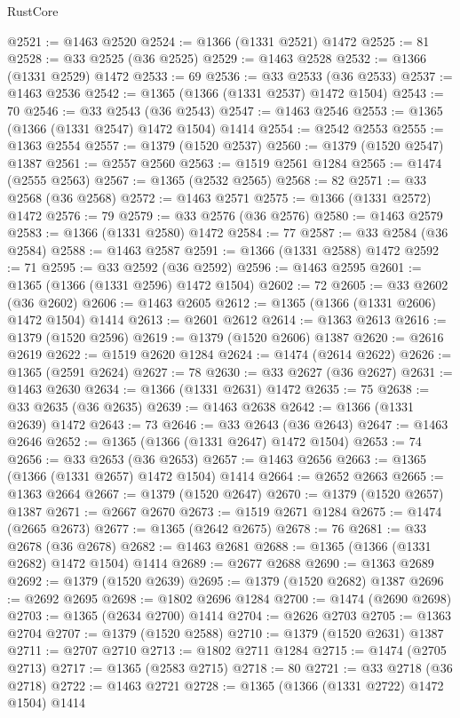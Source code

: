 \begin{lexlean}{RustCore}
\begin{coremodule}
@2521 := @1463 @2520
@2524 := @1366 (@1331 @2521) @1472
@2525 := 81
@2528 := @33 @2525 (@36 @2525)
@2529 := @1463 @2528
@2532 := @1366 (@1331 @2529) @1472
@2533 := 69
@2536 := @33 @2533 (@36 @2533)
@2537 := @1463 @2536
@2542 := @1365 (@1366 (@1331 @2537) @1472 @1504)
@2543 := 70
@2546 := @33 @2543 (@36 @2543)
@2547 := @1463 @2546
@2553 := @1365 (@1366 (@1331 @2547) @1472 @1504) @1414
@2554 := @2542 @2553
@2555 := @1363 @2554
@2557 := @1379 (@1520 @2537)
@2560 := @1379 (@1520 @2547) @1387
@2561 := @2557 @2560
@2563 := @1519 @2561 @1284
@2565 := @1474 (@2555 @2563)
@2567 := @1365 (@2532 @2565)
@2568 := 82
@2571 := @33 @2568 (@36 @2568)
@2572 := @1463 @2571
@2575 := @1366 (@1331 @2572) @1472
@2576 := 79
@2579 := @33 @2576 (@36 @2576)
@2580 := @1463 @2579
@2583 := @1366 (@1331 @2580) @1472
@2584 := 77
@2587 := @33 @2584 (@36 @2584)
@2588 := @1463 @2587
@2591 := @1366 (@1331 @2588) @1472
@2592 := 71
@2595 := @33 @2592 (@36 @2592)
@2596 := @1463 @2595
@2601 := @1365 (@1366 (@1331 @2596) @1472 @1504)
@2602 := 72
@2605 := @33 @2602 (@36 @2602)
@2606 := @1463 @2605
@2612 := @1365 (@1366 (@1331 @2606) @1472 @1504) @1414
@2613 := @2601 @2612
@2614 := @1363 @2613
@2616 := @1379 (@1520 @2596)
@2619 := @1379 (@1520 @2606) @1387
@2620 := @2616 @2619
@2622 := @1519 @2620 @1284
@2624 := @1474 (@2614 @2622)
@2626 := @1365 (@2591 @2624)
@2627 := 78
@2630 := @33 @2627 (@36 @2627)
@2631 := @1463 @2630
@2634 := @1366 (@1331 @2631) @1472
@2635 := 75
@2638 := @33 @2635 (@36 @2635)
@2639 := @1463 @2638
@2642 := @1366 (@1331 @2639) @1472
@2643 := 73
@2646 := @33 @2643 (@36 @2643)
@2647 := @1463 @2646
@2652 := @1365 (@1366 (@1331 @2647) @1472 @1504)
@2653 := 74
@2656 := @33 @2653 (@36 @2653)
@2657 := @1463 @2656
@2663 := @1365 (@1366 (@1331 @2657) @1472 @1504) @1414
@2664 := @2652 @2663
@2665 := @1363 @2664
@2667 := @1379 (@1520 @2647)
@2670 := @1379 (@1520 @2657) @1387
@2671 := @2667 @2670
@2673 := @1519 @2671 @1284
@2675 := @1474 (@2665 @2673)
@2677 := @1365 (@2642 @2675)
@2678 := 76
@2681 := @33 @2678 (@36 @2678)
@2682 := @1463 @2681
@2688 := @1365 (@1366 (@1331 @2682) @1472 @1504) @1414
@2689 := @2677 @2688
@2690 := @1363 @2689
@2692 := @1379 (@1520 @2639)
@2695 := @1379 (@1520 @2682) @1387
@2696 := @2692 @2695
@2698 := @1802 @2696 @1284
@2700 := @1474 (@2690 @2698)
@2703 := @1365 (@2634 @2700) @1414
@2704 := @2626 @2703
@2705 := @1363 @2704
@2707 := @1379 (@1520 @2588)
@2710 := @1379 (@1520 @2631) @1387
@2711 := @2707 @2710
@2713 := @1802 @2711 @1284
@2715 := @1474 (@2705 @2713)
@2717 := @1365 (@2583 @2715)
@2718 := 80
@2721 := @33 @2718 (@36 @2718)
@2722 := @1463 @2721
@2728 := @1365 (@1366 (@1331 @2722) @1472 @1504) @1414

\end{coremodule}
\end{lexlean}
